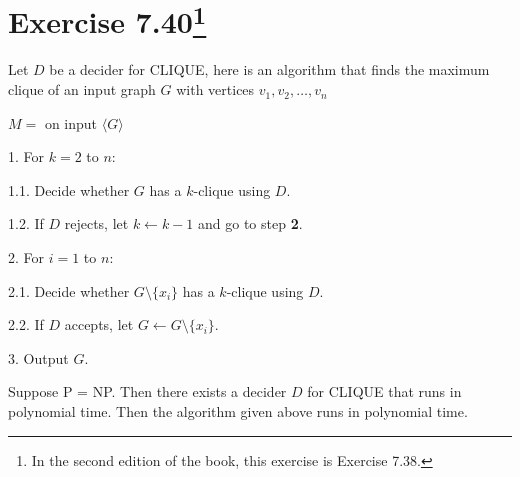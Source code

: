 \section{\texorpdfstring{Exercise 7.40\footnote{In the
second edition of the book, this exercise is Exercise 7.38.}}{Exercise 7.40}}

Let \(D\) be a decider for CLIQUE, here is an algorithm that finds the maximum
clique of an input graph \(G\) with vertices \(v_1,v_2,\ldots,v_n\)
\begin{TMachine}{\(M =\) on input \(\langle G \rangle\)}
\item[1.] For \(k=2\) to \(n\):
\item[1.1.] Decide whether \(G\) has a \(k\)-clique using \(D\).
\item[1.2.] If \(D\) rejects, let \(k \gets k - 1\) and go to step \textbf{2}.
\item[2.] For \(i=1\) to \(n\):
\item[2.1.] Decide whether \(G \setminus \{x_i\}\) has a \(k\)-clique using \(D\).
\item[2.2.] If \(D\) accepts, let \(G \gets G \setminus \{x_i\}\).
\item[3.] Output \(G\).
\end{TMachine}
Suppose P = NP. Then there exists a decider \(D\) for CLIQUE that runs in
polynomial time. Then the algorithm given above runs in polynomial time.
